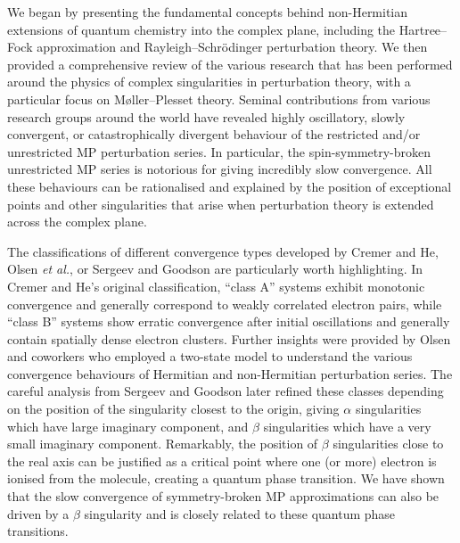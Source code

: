 \documentclass[aps,prb,reprint,noshowkeys,superscriptaddress]{revtex4-1}
\newcommand{\etal}{\textit{et al.}}
\begin{document}
We began by presenting the fundamental concepts behind non-Hermitian extensions of quantum chemistry into the complex plane, 
including the Hartree--Fock approximation and Rayleigh--Schr\"odinger perturbation theory.
We then provided a comprehensive review of the various research that has been performed 
around the physics of complex singularities in perturbation theory, with a particular focus on M{\o}ller--Plesset theory. 
Seminal contributions from various research groups around the world have revealed highly oscillatory,
slowly convergent, or catastrophically divergent behaviour of the restricted and/or unrestricted MP perturbation series.%
\cite{Laidig_1985,Knowles_1985,Handy_1985,Gill_1986,Laidig_1987,Nobes_1987,Gill_1988,Gill_1988a,Lepetit_1988} 
In particular, the spin-symmetry-broken unrestricted MP series is notorious
for giving incredibly slow convergence.\cite{Gill_1986,Nobes_1987,Gill_1988a,Gill_1988}
All these behaviours can be rationalised and explained by the position of exceptional points
and other singularities that arise when perturbation theory is extended across the complex plane.

The classifications of different convergence types developed by Cremer and He,\cite{Cremer_1996} 
Olsen \etal,\cite{Christiansen_1996,Olsen_1996,Olsen_2000,Olsen_2019} 
or Sergeev and Goodson\cite{Goodson_2000a,Goodson_2000b,Goodson_2004,Sergeev_2005,Sergeev_2006} are particularly
worth highlighting.
In Cremer and He's original classification, ``class A'' systems exhibit monotonic convergence and generally
correspond to weakly correlated electron pairs, while ``class B'' systems show erratic convergence after initial 
oscillations and generally contain spatially dense electron clusters.\cite{Cremer_1996}
Further insights were provided by Olsen and coworkers
who employed a two-state model to understand the various convergence behaviours of Hermitian and non-Hermitian 
perturbation series.\cite{Christiansen_1996,Olsen_1996,Olsen_2000,Olsen_2019}
The careful analysis from Sergeev and Goodson later refined these classes depending on the position of the
singularity closest to the origin, giving $\alpha$ singularities which have large imaginary component, 
and $\beta$ singularities which have a very small imaginary component.%
\cite{Goodson_2000a,Goodson_2000b,Goodson_2004,Sergeev_2005,Sergeev_2006}
Remarkably, the position of $\beta$ singularities close to the real axis can be justified as a critical 
point where one (or more) electron is ionised from the molecule, creating a quantum phase transition.\cite{Stillinger_2000}
We have shown that the slow convergence of symmetry-broken MP approximations can also be driven by a $\beta$ 
singularity and is closely related to these quantum phase transitions.
\end{document}
